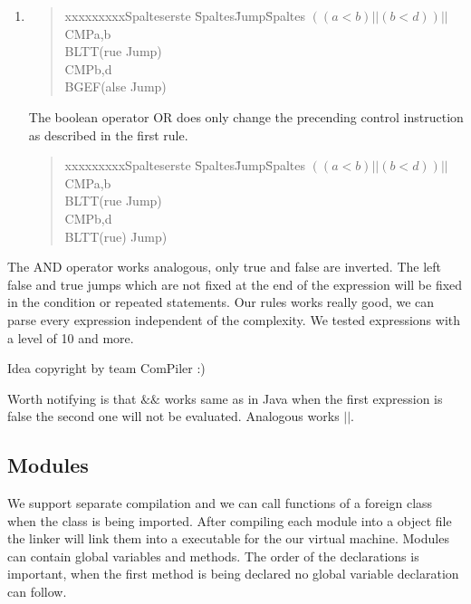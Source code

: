 \begin{enumerate}
\begin{verbatim}
\end{verbatim}

  \item   
  \begin{quote}
	\begin{tabbing}
	xxxxxxxxxSpalteserste \= Spaltes\=  Jump\= Spaltes \kill
	$((a<b) ||  (b<d))||$\>CMP\>a,b\\
	\>BLT\>\>T(rue Jump)\\
	\>CMP\>b,d\\
	\>BGE\>\>F(alse Jump)\\
	\end{tabbing}
	\end{quote}
The boolean operator OR does only change the precending control instruction as described in the first rule.
  \begin{quote}
	\begin{tabbing}
	xxxxxxxxxSpalteserste \= Spaltes\=  Jump\= Spaltes \kill
	$((a<b) ||  (b<d))||$\>CMP\>a,b\\
	\>BLT\>\>T(rue Jump)\\
	\>CMP\>b,d\\
	\>BLT\>\>T(rue) Jump)\\
	\end{tabbing}
	\end{quote}
\end{enumerate}
The AND operator works analogous, only true and false are inverted. The left false and true jumps which are not fixed at the end of the
expression will be fixed in the condition or repeated statements. Our rules works
really good, we can parse every expression independent of the complexity. We tested expressions with a level of 10 and more. \begin{small}
                                                          Idea copyright by team ComPiler :)
                                                          \end{small}
Worth notifying is that $\&\&$ works same as in Java when the first
expression is false the second one will not be evaluated. Analogous works $||$.
\subsection{Modules}
We support separate compilation and we can call functions of a foreign class when the class is being imported. After compiling each module
into a object file the linker will link them into a executable for the our virtual machine. Modules can contain global variables and methods.
 The order of the declarations is important, when the first method is being declared no global variable declaration can
 follow.



